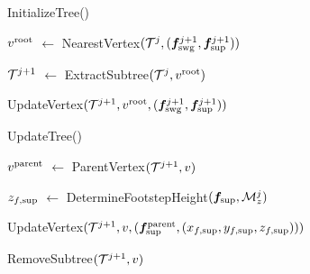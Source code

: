 \begin{procedure}%
	\small
	\removelatexerror
	\label{proc:InitializeTree}
	\caption{InitializeTree()}
	\vspace{2pt}
    \BlankLine
	
	$v^{\rm root}$ $\leftarrow$ NearestVertex$({\cal T}^j, ({\bm{f}}_{\rm swg}^{j+1}, {\bm{f}}_{\rm sup}^{j+1}))$\;
	
	${\cal T}^{j+1}$ $\leftarrow$ ExtractSubtree$({\cal T}^j, v^{\rm root})$\;
	
	UpdateVertex$({\cal T}^{j+1}, v^{\rm root}, ({\bm{f}}_{\rm swg}^{j+1}, {\bm{f}}_{\rm sup}^{j+1}))$\;
	
    \;
	
\end{procedure}

\begin{procedure}%
	\small
	\removelatexerror
	\label{proc:UpdateTree}
	
    \caption{UpdateTree()}
	\vspace{2pt}
    \BlankLine
	
	$v^{\rm parent}$ $\leftarrow$ ParentVertex$({\cal T}^{j+1}, v)$\;
    
    $z_{f, \rm sup}$ $\leftarrow$ DetermineFootstepHeight$({\bm{f}}_{\rm sup}, {\cal M}_z^j)$\;
    
    UpdateVertex$({\cal T}^{j+1}, v, ({\bm{f}}_{\rm sup}^{\rm parent}, (x_{f, \rm sup}, y_{f, \rm sup}, z_{f, \rm sup})))$\;
    
	{
 	    RemoveSubtree$({\cal T}^{j+1}, v)$\; 	
 	}
	 
    \Return\;   
	
\end{procedure}
